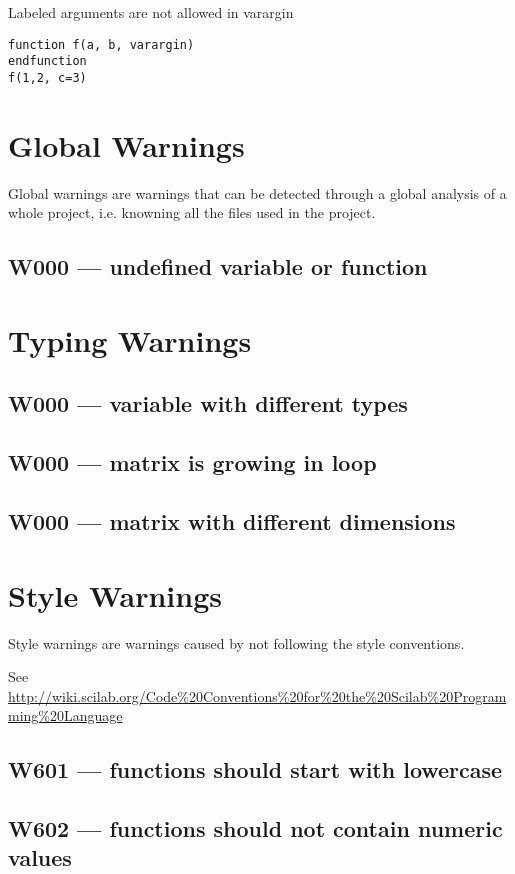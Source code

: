 Labeled arguments are not allowed in varargin

\begin{verbatim}
function f(a, b, varargin)
endfunction
f(1,2, c=3)
\end{verbatim}


\section{Global Warnings}

Global warnings are warnings that can be detected through a global
analysis of a whole project, i.e. knowning all the files used in the
project.

\subsection{W000 --- undefined variable or function}




\section{Typing Warnings}



\subsection{W000 --- variable with different types}




\subsection{W000 --- matrix is growing in loop}




\subsection{W000 --- matrix with different dimensions}




\section{Style Warnings}



Style warnings are warnings caused by not following the style conventions.



See \url{http://wiki.scilab.org/Code%20Conventions%20for%20the%20Scilab%20Programming%20Language}



\subsection{W601 --- functions should start with lowercase}




\subsection{W602 --- functions should not contain numeric values}




